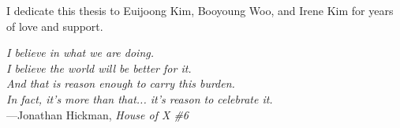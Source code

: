 %
\begin{frontmatter}

%
%
\makefrontmatter

%
%
%
%
%
%
\begin{dedication}
  I dedicate this thesis to Euijoong Kim, Booyoung Woo, and Irene Kim for years of love and support.
\end{dedication}


%
%



%
%
\begin{epigraph} %
  \emph{I believe in what we are doing.\\
  I believe the world will be better for it.\\
  And that is reason enough to carry this burden.\\
  In fact, it's more than that... it's reason to celebrate it.}\\
  ---Jonathan Hickman, \textit{House of X \#6}
\end{epigraph}



%
\tableofcontents
\listoffigures  %
\listoftables   %




\end{frontmatter}
